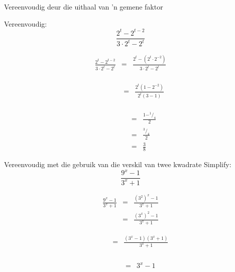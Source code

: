 
\begin{wex}
{%
Vereenvoudig deur die uithaal van 'n gemene faktor
}
{%
Vereenvoudig: $$\frac{2^t-2^{t-2}}{3\cdot2^t-2^t} $$

}
{%
\begin{eqnarray*}
\frac{2^t-2^{t-2}}{3\cdot2^t-2^t} & = & \frac{2^t-(2^t\cdot2^{-2})}{3\cdot2^t-2^t} \\
\end{eqnarray*}


\begin{eqnarray*}
\phantom{\frac{2^t-2^{t-2}}{3\cdot2^t-2^t}}  & = & \frac{2^t(1-2^{-2})}{2^t(3-1)} \\
\end{eqnarray*}



\begin{eqnarray*}
\phantom{\frac{2^t-2^{t-2}}{3\cdot2^t-2^t}}  & = & \frac{1-^1/_4}{2} \\
					     & = & \frac{^3/_4}{2} \\
					     & = & \frac{3}{8}
\end{eqnarray*}


} 
\end{wex}




\begin{wex}
{
Vereenvoudig met die gebruik van die verskil van twee kwadrate
}
{
Simplify: 
$$ \frac{9^x-1}{3^x+1} $$
}
{
\begin{eqnarray*}
 \frac{9^x-1}{3^x+1} & = & \frac{(3^2)^x -1}{3^x+1} \\
		     & = & \frac{(3^x)^2-1}{3^x+1} 
\end{eqnarray*}


\begin{eqnarray*}
 \phantom{\frac{9^x-1}{3^x+1}} & = & \frac{(3^x-1)(3^x+1)}{3^x+1}\\
\end{eqnarray*}


\begin{eqnarray*}
 \phantom{\frac{9^x-1}{3^x+1}} & = & 3^x-1\\
\end{eqnarray*}

}
\end{wex}


